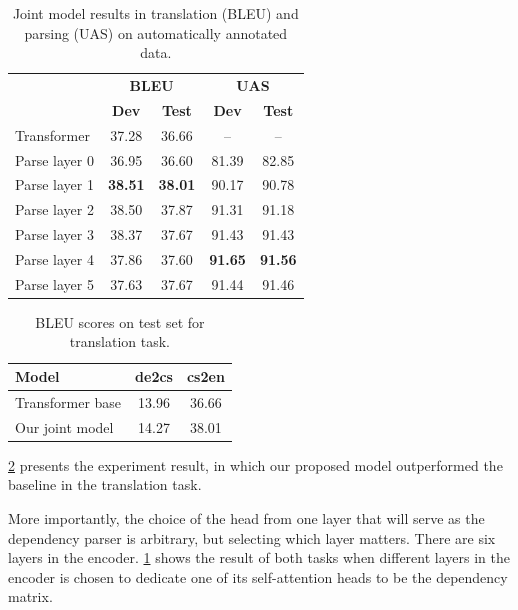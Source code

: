 \begin{table}
\centering
\small
\vspace{2ex}
  \begin{tabular}{lcc|cc}
    &  \multicolumn{2}{c}{\textbf{BLEU}} & \multicolumn{2}{|c}{\textbf{UAS}} \\
    & \textbf{Dev} & \textbf{Test} & \textbf{Dev} & \textbf{Test} \\
    \hline
    Transformer & 37.28 & 36.66 & -- & -- \\
    \hline
    Parse layer 0 & 36.95 & 36.60 & 81.39 & 82.85 \\
    Parse layer 1 & \textbf{38.51} & \textbf{38.01} & 90.17 & 90.78 \\
    Parse layer 2 & 38.50 & 37.87 & 91.31 & 91.18 \\
    Parse layer 3 & 38.37 & 37.67 & 91.43 & 91.43 \\
    Parse layer 4 & 37.86 & 37.60 & \textbf{91.65} & \textbf{91.56} \\
    Parse layer 5 & 37.63 & 37.67 & 91.44 & 91.46 \\
  \end{tabular}
  \caption{Joint model results in translation (BLEU) and parsing (UAS) on automatically annotated data.}
  \label{tab:trans_depparse_res}
\end{table}

\begin{table}
\begin{center}
\small
\begin{tabular}{lcc}
\textbf{Model}        	& \textbf{de2cs}	& \textbf{cs2en}	\\
\hline
Transformer base    & 13.96	&  36.66 \\
Our joint model		& 14.27	&  38.01 \\
\end{tabular}
\end{center}
\caption{BLEU scores on test set for translation task.}
\label{multidec-results}
\end{table}


\cref{multidec-results} presents the experiment result, in which our proposed
model outperformed the baseline in the translation task.

More importantly, the choice of the head from one layer that will serve as the
dependency parser is arbitrary, but selecting which layer matters. There are six
layers in the encoder. \cref{tab:trans_depparse_res} shows the result of both
tasks when different layers in the encoder is chosen to dedicate one of its
self-attention heads to be the dependency matrix.


